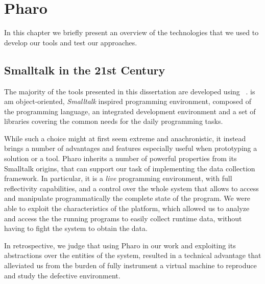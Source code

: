 
\chapter{Pharo}\label{ch:pharo}

In this chapter we briefly present an overview of the technologies that we used to develop our tools and test our approaches.


\section{Smalltalk in the 21st Century}

The majority of the tools presented in this dissertation are developed using \pha~\cite{black2009}.
\pha is am object-oriented, \textit{Smalltalk} inspired programming environment, composed of the \pha programming language, an integrated development environment and a set of libraries covering the common needs for the daily programming tasks.

While such a choice might at first seem extreme and anachronistic, it instead brings a number of advantages and features especially useful when prototyping a solution or a tool.
Pharo inherits a number of powerful properties from its Smalltalk origins, that can support our task of implementing the data collection framework.
In particular, it is a \emph{live} programming environment, with full reflectivity capabilities, and a control over the whole system that allows to access and manipulate programmatically the complete state of the program.
We were able to exploit the characteristics of the platform, which allowed us to analyze and access the the running programs to easily collect runtime data, without having to fight the system to obtain the data.

In retrospective, we judge that using Pharo in our work and exploiting its abstractions over the entities of the system, resulted in a technical advantage that alleviated us from the burden of fully instrument a virtual machine to reproduce and study the defective environment.


